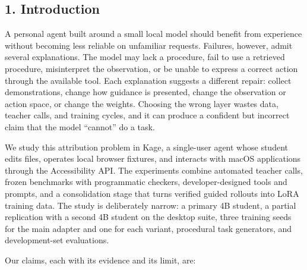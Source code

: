 \documentclass[
  10pt,
]{article}
\begin{document}
\subsection{1. Introduction}\label{introduction}

A personal agent built around a small local model should benefit from
experience without becoming less reliable on unfamiliar requests.
Failures, however, admit several explanations. The model may lack a
procedure, fail to use a retrieved procedure, misinterpret the
observation, or be unable to express a correct action through the
available tool. Each explanation suggests a different repair: collect
demonstrations, change how guidance is presented, change the observation
or action space, or change the weights. Choosing the wrong layer wastes
data, teacher calls, and training cycles, and it can produce a confident
but incorrect claim that the model ``cannot'' do a task.

We study this attribution problem in Kage, a single-user agent whose
student edits files, operates local browser fixtures, and interacts with
macOS applications through the Accessibility API. The experiments
combine automated teacher calls, frozen benchmarks with programmatic
checkers, developer-designed tools and prompts, and a consolidation
stage that turns verified guided rollouts into LoRA training data. The
study is deliberately narrow: a primary 4B student, a partial
replication with a second 4B student on the desktop suite, three
training seeds for the main adapter and one for each variant, procedural
task generators, and development-set evaluations.

Our claims, each with its evidence and its limit, are:
\end{document}
